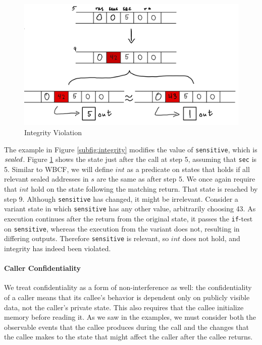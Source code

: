 \documentclass[10pt,conference]{ieeetran}%
\theoremstyle{definition}
\begin{document}
\begin{figure}
  \includegraphics[width=\columnwidth]{variants.png}
  \caption{Integrity Violation}
  \label{fig:variant}
\end{figure}

The example in Figure \ref{subfig:integrity} modifies the value of {\tt sensitive},
which is \(\mathit{sealed}\). Figure \ref{fig:variant} shows the state just after the call at step 5,
assuming that {\tt sec} is 5. Similar to WBCF, we will define
\(int\)  as a predicate on states that holds if
all relevant sealed addresses in \(s\) are the same as after step 5.
We once again require that \(int\) hold on the state following the matching return.
That state is reached by step 9. Although {\tt sensitive} has changed, it might be
irrelevant. Consider a variant state in which {\tt sensitive} has any other value, arbitrarily
choosing 43. As execution continues after the return from the original state, it
passes the {\tt if}-test on {\tt sensitive}, whereas the execution from the variant does not, resulting
in differing outputs. Therefore {\tt sensitive} is relevant, so \(int\) does not hold,
and integrity has indeed been violated.

\paragraph*{Caller Confidentiality}

We treat confidentiality as a form of non-interference as well: the confidentiality of a caller
means that its callee's behavior is dependent only on publicly visible data,
not the caller's private state. This also requires that the callee initialize
memory before reading it.
As we saw in the examples, we must consider both the observable events
that the callee produces during the call and the changes that the callee makes to the state that might
affect the caller after the callee returns.
\end{document}
